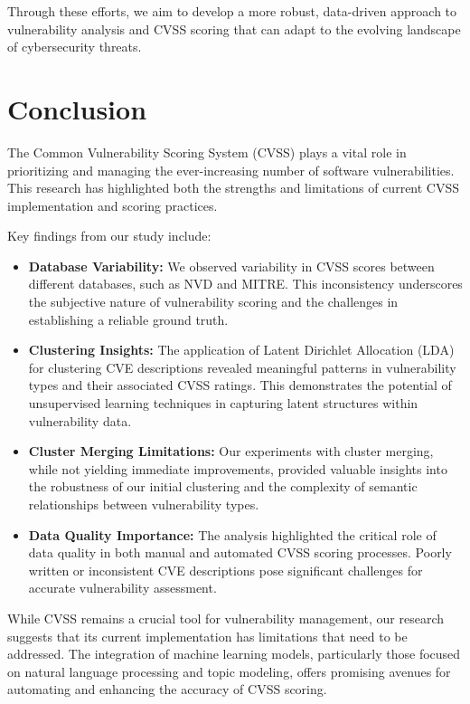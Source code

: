 \documentclass[12pt]{article}
\begin{document}
Through these efforts, we aim to develop a more robust, data-driven approach to vulnerability
analysis and CVSS scoring that can adapt to the evolving landscape of cybersecurity threats.

\section{Conclusion}

The Common Vulnerability Scoring System (CVSS) plays a vital role in prioritizing and managing the
ever-increasing number of software vulnerabilities. This research has highlighted both the strengths
and limitations of current CVSS implementation and scoring practices.

Key findings from our study include:

\begin{itemize}

	\item \textbf{Database Variability:} We observed variability in CVSS scores between
	      different databases, such as NVD and MITRE. This inconsistency underscores the subjective
	      nature of vulnerability scoring and the challenges in establishing a reliable ground truth.

	\item \textbf{Clustering Insights:} The application of Latent Dirichlet Allocation (LDA) for
	      clustering CVE descriptions revealed meaningful patterns in vulnerability types and their
	      associated CVSS ratings. This demonstrates the potential of unsupervised learning techniques
	      in capturing latent structures within vulnerability data.

	\item \textbf{Cluster Merging Limitations:} Our experiments with cluster merging, while not
	      yielding immediate improvements, provided valuable insights into the robustness of our
	      initial clustering and the complexity of semantic relationships between vulnerability types.

	\item \textbf{Data Quality Importance:} The analysis highlighted the critical role of data
	      quality in both manual and automated CVSS scoring processes. Poorly written or inconsistent
	      CVE descriptions pose significant challenges for accurate vulnerability assessment.

\end{itemize}

While CVSS remains a crucial tool for vulnerability management, our research suggests that its
current implementation has limitations that need to be addressed. The integration of machine
learning models, particularly those focused on natural language processing and topic modeling,
offers promising avenues for automating and enhancing the accuracy of CVSS scoring.
\end{document}
